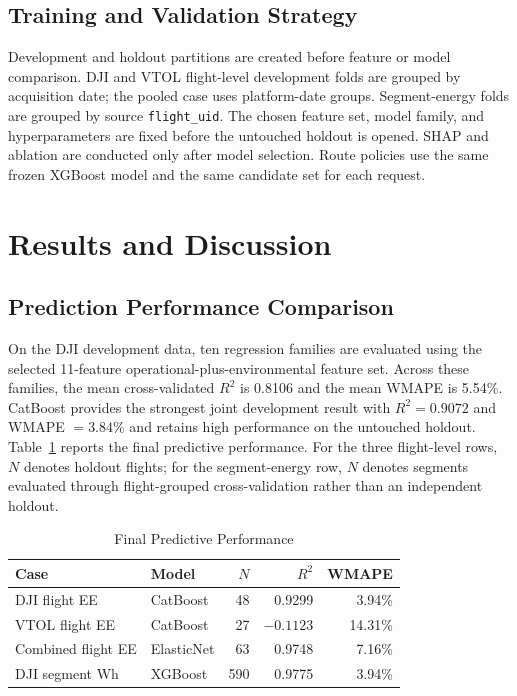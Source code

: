\documentclass[conference,a4paper]{IEEEtran}
\begin{document}
\subsection{Training and Validation Strategy}
Development and holdout partitions are created before feature or model comparison. DJI and VTOL flight-level development folds are grouped by acquisition date; the pooled case uses platform-date groups. Segment-energy folds are grouped by source \texttt{flight\_uid}. The chosen feature set, model family, and hyperparameters are fixed before the untouched holdout is opened. SHAP and ablation are conducted only after model selection. Route policies use the same frozen XGBoost model and the same candidate set for each request.

\section{Results and Discussion}

\subsection{Prediction Performance Comparison}
On the DJI development data, ten regression families are evaluated using the
selected 11-feature operational-plus-environmental feature set. Across these
families, the mean cross-validated $R^2$ is 0.8106 and the mean WMAPE is
5.54\%. CatBoost provides the strongest joint development result with
$R^2=0.9072$ and WMAPE $=3.84\%$ and retains high performance on the
untouched holdout. Table~\ref{tab:performance} reports the final predictive
performance. For the three flight-level rows, $N$ denotes holdout flights;
for the segment-energy row, $N$ denotes segments evaluated through
flight-grouped cross-validation rather than an independent holdout.

\begin{table}[H]
\caption{Final Predictive Performance}
\label{tab:performance}
\centering
\scriptsize
\setlength{\tabcolsep}{2.8pt}
\begin{tabular}{l l r r r}
\toprule
Case & Model & $N$ & $R^2$ & WMAPE \\
\midrule
DJI flight EE & CatBoost & 48 & 0.9299 & 3.94\% \\
VTOL flight EE & CatBoost & 27 & $-0.1123$ & 14.31\% \\
Combined flight EE & ElasticNet & 63 & 0.9748 & 7.16\% \\
DJI segment Wh & XGBoost & 590 & 0.9775 & 3.94\% \\
\bottomrule
\end{tabular}
\end{table}
\end{document}
